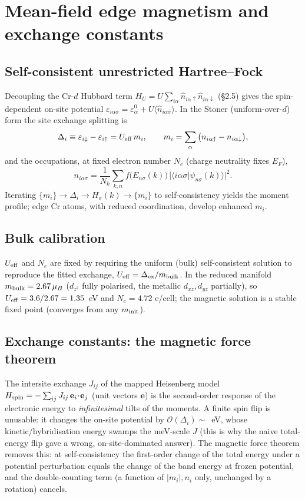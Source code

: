 \documentclass[11pt]{article}
\begin{document}
\section{Mean-field edge magnetism and exchange constants}

\subsection{Self-consistent unrestricted Hartree--Fock}
Decoupling the Cr-$d$ Hubbard term $H_U=U\sum_{i\alpha}\hat n_{i\alpha\uparrow}\hat n_{i\alpha\downarrow}$
(\S2.5) gives the spin-dependent on-site potential
$\varepsilon_{i\alpha\sigma}=\varepsilon^0_\alpha+U\langle\hat n_{i\alpha\bar\sigma}\rangle$. In the
Stoner (uniform-over-$d$) form the site exchange splitting is
\begin{equation}
\Delta_i\equiv\varepsilon_{i\downarrow}-\varepsilon_{i\uparrow}=U_{\rm eff}\,m_i,
\qquad m_i=\sum_\alpha\big(n_{i\alpha\uparrow}-n_{i\alpha\downarrow}\big),
\end{equation}
and the occupations, at fixed electron number $N_e$ (charge neutrality fixes $E_F$),
\begin{equation}
n_{i\alpha\sigma}=\frac1{N_k}\sum_{k,n}f\!\big(E_{n\sigma}(k)\big)\,
\big|\langle i\alpha\sigma|\psi_{n\sigma}(k)\rangle\big|^2 .
\end{equation}
Iterating $\{m_i\}\to\Delta_i\to H_\sigma(k)\to\{m_i\}$ to self-consistency yields the moment
profile; edge Cr atoms, with reduced coordination, develop enhanced $m_i$.

\subsection{Bulk calibration}
$U_{\rm eff}$ and $N_e$ are fixed by requiring the uniform (bulk) self-consistent solution to
reproduce the fitted exchange, $U_{\rm eff}=\Delta_{\rm ex}/m_{\rm bulk}$. In the reduced manifold
$m_{\rm bulk}=2.67\,\mu_B$ ($d_{z^2}$ fully polarised, the metallic $d_{xz},d_{yz}$ partially), so
$U_{\rm eff}=3.6/2.67=1.35$~eV and $N_e=4.72$ e/cell; the magnetic solution is a stable fixed point
(converges from any $m_{\rm init}$).

\subsection{Exchange constants: the magnetic force theorem}
The intersite exchange $J_{ij}$ of the mapped Heisenberg model
$H_{\rm spin}=-\sum_{ij}J_{ij}\,\mathbf e_i\!\cdot\!\mathbf e_j$ (unit vectors $\mathbf e$) is the
second-order response of the electronic energy to \emph{infinitesimal} tilts of the moments. A
finite spin flip is unusable: it changes the on-site potential by $\mathcal O(\Delta_i)\sim$~eV,
whose kinetic/hybridisation energy swamps the meV-scale $J$ (this is why the naive total-energy
flip gave a wrong, on-site-dominated answer). The magnetic force theorem removes this: at
self-consistency the first-order change of the total energy under a potential perturbation equals
the change of the band energy at frozen potential, and the double-counting term (a function of
$|m_i|,n_i$ only, unchanged by a rotation) cancels.
\end{document}

